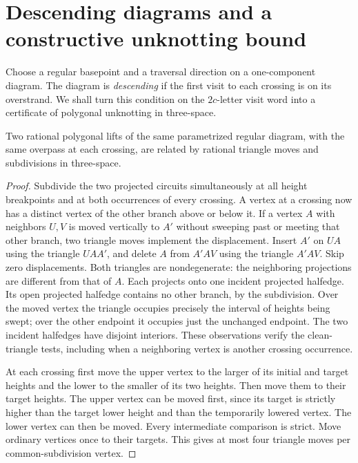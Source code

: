 \section{Descending diagrams and a constructive unknotting bound}
\label{sec:descending}

Choose a regular basepoint and a traversal direction on a one-component
diagram. The diagram is \emph{descending} if the first visit to each
crossing is on its overstrand. We shall turn this condition on the
$2c$-letter visit word into a certificate of polygonal unknotting in
three-space.

\begin{lemma}
Two rational polygonal lifts of the same parametrized regular diagram,
with the same overpass at each crossing, are related by rational
triangle moves and subdivisions in three-space.
\end{lemma}
\begin{proof}
Subdivide the two projected circuits simultaneously at all height
breakpoints and at both occurrences of every crossing. A vertex at a
crossing now has a distinct vertex of the other branch above or below it.
If a vertex $A$ with neighbors $U,V$ is moved vertically to $A'$ without
sweeping past or meeting that other branch, two triangle moves implement
the displacement. Insert $A'$ on $U A$ using the triangle $UAA'$, and
delete $A$ from $A'AV$ using the triangle $A'AV$. Skip zero displacements.
Both triangles are nondegenerate: the neighboring projections are
different from that of $A$. Each projects onto one incident projected
halfedge. Its open projected halfedge contains no other branch, by the
subdivision. Over the moved vertex the triangle occupies precisely the
interval of heights being swept; over the other endpoint it occupies
just the unchanged endpoint. The two incident halfedges have disjoint
interiors. These observations verify the clean-triangle tests, including
when a neighboring vertex is another crossing occurrence.

At each crossing first move the upper vertex to the larger of its
initial and target heights and the lower to the smaller of its two
heights. Then move them to their target heights. The
upper vertex can be moved first, since its target is strictly higher
than the target lower height and than the temporarily lowered vertex.
The lower vertex can then be moved. Every intermediate comparison is
strict. Move ordinary vertices once to their targets. This gives at most
four triangle moves per common-subdivision vertex.
\end{proof}

